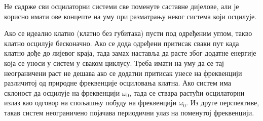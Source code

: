 \documentclass[master]{finthesis}
\begin{document}
Не садрже сви осцилаторни системи све поменуте саставне дијелове, али је корисно имати ове концепте на уму при разматрању неког система који осцилује. \par
Ако се идеално клатно (клатно без губитака) пусти под одређеним углом, такво клатно осцилује бесконачно. Ако се дода одређени притисак сваки пут када клатно дође до лијевог краја, тада замах наставља да расте због додатне енергије која се уноси у систем у сваком циклусу. Треба имати на уму да се тај неограничени раст не дешава ако се додатни притисак унесе на фреквенцији различитој од природне фреквенције осциловања клатна. Ако систем има склоност да осцилује на фреквенцији $\omega_{0}$, тада се ствара растући осцилаторни излаз као одговор на спољашњу побуду на фреквенцији $\omega_{0}$. Из друге перспективе, такав систем неограничено појачава периодични улаз на поменутој фреквенцији.
\end{document}
